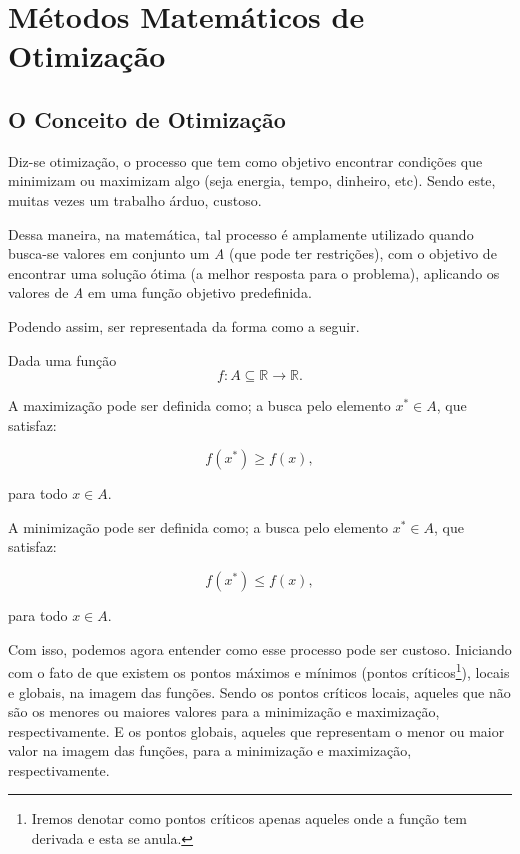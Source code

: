 

\chapter{\Large{Métodos Matemáticos de Otimização}}\label{chp:1}


\section{{O Conceito de Otimização}}

\hspace{0.8cm}
Diz-se otimização, o processo que tem como objetivo encontrar condições que
minimizam ou maximizam algo (seja energia, tempo, dinheiro, etc). Sendo este,
muitas vezes um trabalho árduo, custoso.

Dessa maneira, na matemática, tal processo é amplamente utilizado quando
busca-se valores em conjunto um \textit{A} (que pode ter restrições), com o
objetivo de encontrar uma solução ótima (a melhor resposta para o problema),
aplicando os valores de \textit{A} em uma função objetivo predefinida.

Podendo assim, ser representada da forma como a seguir.

Dada uma função
\begin{equation}
    f : A \subseteq \mathbb{R} \rightarrow \mathbb{R}.
\end{equation}


A maximização pode ser definida como; a busca pelo elemento
\(x^* \in A\), que satisfaz:

\begin{equation}
    f(x^*) \geq f(x),
\end{equation}

para todo \(x \in A\).


A minimização pode ser definida como; a busca pelo elemento \(x^* \in A\),
que satisfaz:

\begin{equation}
    f(x^*) \leq f(x),
\end{equation}

para todo \(x \in A\).

\vspace{\baselineskip}
Com isso, podemos agora entender como esse processo pode ser custoso. Iniciando
com o fato de que existem os pontos máximos e mínimos (pontos
críticos\footnote{Iremos denotar como pontos críticos apenas aqueles onde a
função tem derivada e esta se anula.}), locais e globais, na imagem das
funções. Sendo os pontos críticos locais, aqueles que não são os menores ou
maiores valores para a minimização e maximização, respectivamente. E os pontos
globais, aqueles que representam o menor ou maior valor na imagem das funções,
para a minimização e maximização, respectivamente.

